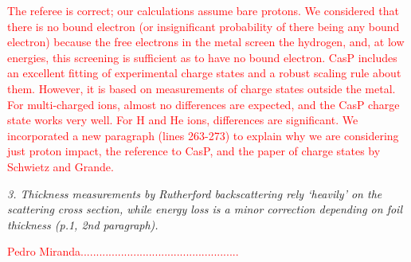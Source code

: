 \documentclass[a4paper,10pt]{article}
\def\reviewer#1{\vspace{0.35cm}\textsl{#1}}
\def\reply#1{\vspace{0.1cm}\textcolor{red}{#1}}
\begin{document}
\reply{The referee is correct; our calculations assume bare protons. We
considered that there is no bound electron (or insignificant probability
of there being any bound electron) because the free electrons in the
metal screen the hydrogen, and, at low energies, this screening is
sufficient as to have no bound electron. CasP includes an excellent
fitting of experimental charge states and a robust scaling rule about
them. However, it is based on measurements of charge states outside the
metal. For multi-charged ions, almost no differences are expected, and
the CasP charge state works very well. For H and He ions, differences
are significant.  We incorporated a new paragraph (lines 263-273) to
explain why we are considering just proton impact, the reference to
CasP, and the paper of charge states by Schwietz and Grande.}

\reviewer{3. Thickness measurements by Rutherford backscattering rely 
‘heavily’ on the scattering cross section, while energy loss is a minor 
correction depending on foil thickness (p.1, 2nd paragraph).}

\reply{Pedro Miranda...................................................}
\end{document}
